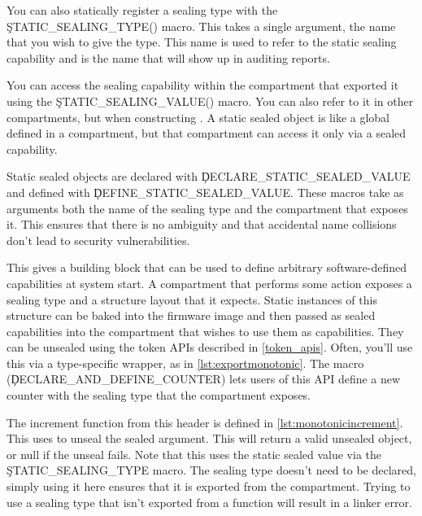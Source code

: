 You can also statically register a sealing type with the \c{STATIC_SEALING_TYPE()} macro.
This takes a single argument, the name that you wish to give the type.
This name is used to refer to the static sealing capability and is the name that will show up in auditing reports.


You can access the sealing capability within the compartment that exported it using the \c{STATIC_SEALING_VALUE()} macro.
You can also refer to it in other compartments, but  when constructing .
A static sealed object is like a global defined in a compartment, but that compartment can access it only via a sealed capability.

Static sealed objects are declared with \c{DECLARE_STATIC_SEALED_VALUE} and defined with \c{DEFINE_STATIC_SEALED_VALUE}.
These macros take as arguments both the name of the sealing type and the compartment that exposes it.
This ensures that there is no ambiguity and that accidental name collisions don't lead to security vulnerabilities.



This gives a building block that can be used to define arbitrary software-defined capabilities at system start.
A compartment that performs some action exposes a sealing type and a structure layout that it expects.
Static instances of this structure can be baked into the firmware image and then passed as sealed capabilities into the compartment that wishes to use them as capabilities.
They can be unsealed using the token APIs described in \ref{token_apis}.
Often, you'll use this via a type-specific wrapper, as in \ref{lst:exportmonotonic}.
The macro (\c{DECLARE_AND_DEFINE_COUNTER}) lets users of this API define a new counter with the sealing type that the compartment exposes.

\codelisting[filename=examples/software_capability/monotonic_counter.hh,marker=export,label=lst:exportmonotonic,caption="A header defining an interface using sealed objects."]{}

The increment function from this header is defined in \ref{lst:monotonicincrement}.
This uses  to unseal the sealed argument.
This will return a valid unsealed object, or null if the unseal fails.
Note that this uses the static sealed value via the \c{STATIC_SEALING_TYPE} macro.
The sealing type doesn't need to be declared, simply using it here ensures that it is exported from the compartment.
Trying to use a sealing type that isn't exported from a function will result in a linker error.

